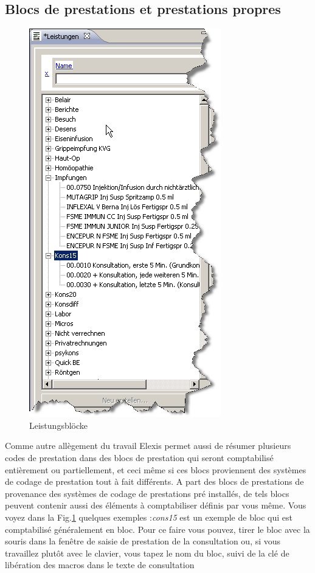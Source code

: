 \subsection{Blocs de prestations et prestations propres}
\begin{figure}
\includegraphics{images/block1}
\caption{Leistungsblöcke}
\label{fig:bloecke}
\end{figure}
Comme autre allègement du travail Elexis permet aussi de résumer plusieurs codes de prestation dans des blocs de prestation qui seront comptabilisé entièrement ou partiellement, et ceci même si ces blocs proviennent des systèmes de codage de prestation tout à fait différents. A part des blocs de prestations de provenance des systèmes de codage de prestations pré installés, de tels blocs peuvent contenir aussi des éléments à comptabiliser définis par vous même.
Vous voyez dans la Fig.\ref{fig:bloecke} quelques exemples :\textit{cons15} est un exemple de bloc qui est comptabilisé
généralement en bloc. Pour ce faire vous pouvez, tirer le bloc avec la souris dans la fenêtre de saisie de prestation de la consultation ou, si vous travaillez plutôt avec le clavier, vous tapez le nom du bloc, suivi de la clé de libération des macros dans le texte de consultation
